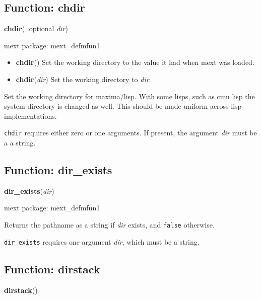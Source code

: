 \documentclass[]{article}
\begin{document}
\subsection{Function: chdir\label{sec:chdir}}
\hypertarget{chdir}{}
{\bf chdir}( :optional {\it dir})


\noindent mext package: mext\_defmfun1



\vspace{5 pt}
\begin{itemize}
\item[] {\bf chdir}()
  Set the working directory to the value it had when mext was loaded. 

\item[] {\bf chdir}({\it dir})
  Set the working directory to {\it dir}. 

\end{itemize}
Set the working directory for maxima/lisp. With some lisps, such as cmu lisp the system directory is changed as well. This should be made uniform across lisp implementations. 

\vspace{5 pt}

   {\tt chdir} requires either zero or one arguments. If present, the argument {\it dir} must be a a string.


\vspace{5 pt}


\subsection{Function: dir\_exists\label{sec:dir_exists}}
\hypertarget{dir_exists}{}
{\bf dir\_exists}({\it dir})


\noindent mext package: mext\_defmfun1



\vspace{5 pt}
Returns the pathname as a string if {\it dir} exists, and \verb#false# otherwise. 

\vspace{5 pt}

   {\tt dir\_exists} requires one argument {\it dir}, which must be a string.


\vspace{5 pt}


\subsection{Function: dirstack\label{sec:dirstack}}
\hypertarget{dirstack}{}
{\bf dirstack}()
\end{document}
